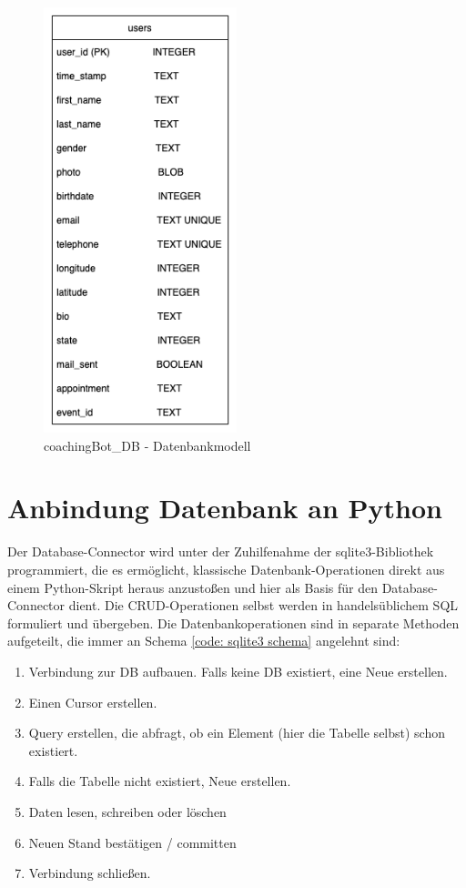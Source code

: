         \begin{figure} %
            \centering
            \includegraphics[width=0.5\textwidth]{images/220325_PA28464_DataBaseModel.png}
            \caption{coachingBot\_DB - Datenbankmodell}
            \label{fig: data base model}
        \end{figure}

    \section{Anbindung Datenbank an Python}
        Der Database-Connector wird unter der Zuhilfenahme der sqlite3-Bibliothek programmiert, die es ermöglicht, klassische Datenbank-Operationen direkt aus einem Python-Skript heraus anzustoßen und hier als Basis für den Database-Connector dient. Die CRUD-Operationen selbst werden in handelsüblichem SQL formuliert und übergeben. Die Datenbankoperationen sind in separate Methoden aufgeteilt, die immer an Schema \ref*{code: sqlite3 schema} angelehnt sind: 
        \begin{enumerate}
            \item Verbindung zur DB aufbauen. Falls keine DB existiert, eine Neue erstellen.
            \item Einen Cursor erstellen.
            \item Query erstellen, die abfragt, ob ein Element (hier die Tabelle selbst) schon existiert.
            \item Falls die Tabelle nicht existiert, Neue erstellen.
            \item Daten lesen, schreiben oder löschen
            \item Neuen Stand bestätigen / committen
            \item Verbindung schließen.
        \end{enumerate}

